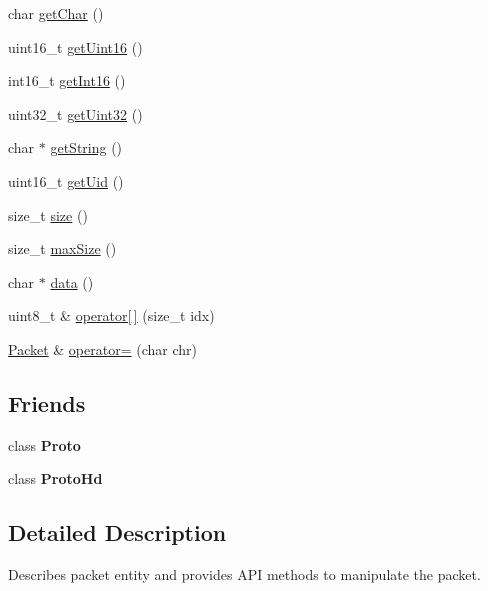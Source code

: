 \begin{DoxyCompactItemize}
char \hyperlink{classTiny_1_1Packet_a260645f9d055da878f149a13ecd58844}{get\+Char} ()
\item 
uint16\+\_\+t \hyperlink{classTiny_1_1Packet_a71765e73adfbc67138f75c2b8ea7d74c}{get\+Uint16} ()
\item 
int16\+\_\+t \hyperlink{classTiny_1_1Packet_a7dfed04418564f93dd4d2b4e9144a861}{get\+Int16} ()
\item 
uint32\+\_\+t \hyperlink{classTiny_1_1Packet_a5dd4b89cb7224b62d4f0328c8e40f38f}{get\+Uint32} ()
\item 
char $\ast$ \hyperlink{classTiny_1_1Packet_a8bc9a3b3f41be292f9c5ac566afeb04b}{get\+String} ()
\item 
uint16\+\_\+t \hyperlink{classTiny_1_1Packet_a5333df49a8becff438d3e36b0ca8d3f0}{get\+Uid} ()
\item 
size\+\_\+t \hyperlink{classTiny_1_1Packet_a872f81d4ad35e49b232101c7c12e34f2}{size} ()
\item 
size\+\_\+t \hyperlink{classTiny_1_1Packet_ac6545b3b5df97d5f1ea1a15abc0570ed}{max\+Size} ()
\item 
char $\ast$ \hyperlink{classTiny_1_1Packet_a3307ba504caba9c5eee8f1f32cf1a749}{data} ()
\item 
uint8\+\_\+t \& \hyperlink{classTiny_1_1Packet_abfaef504eb88a4db88bca3b907770fa2}{operator\mbox{[}$\,$\mbox{]}} (size\+\_\+t idx)
\item 
\hyperlink{classTiny_1_1Packet}{Packet} \& \hyperlink{classTiny_1_1Packet_a2de2c7f2c3ea6baaab462dd7e4469ecb}{operator=} (char chr)
\end{DoxyCompactItemize}
\subsection*{Friends}
\begin{DoxyCompactItemize}
\item 
\hypertarget{classTiny_1_1Packet_a45bd055fddab40aaf0c60bfb9e21aa6f}{}class {\bfseries Proto}\label{classTiny_1_1Packet_a45bd055fddab40aaf0c60bfb9e21aa6f}

\item 
\hypertarget{classTiny_1_1Packet_a7f90e063a34c3417ed1ea25e64608857}{}class {\bfseries Proto\+Hd}\label{classTiny_1_1Packet_a7f90e063a34c3417ed1ea25e64608857}

\end{DoxyCompactItemize}


\subsection{Detailed Description}
Describes packet entity and provides A\+P\+I methods to manipulate the packet. 

